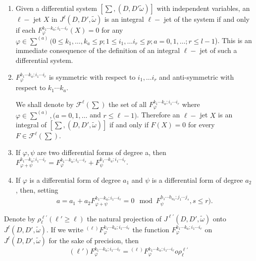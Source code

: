 \begin{remarks*}%
\begin{enumerate}[\rm (1)]
\item Given a differential system $[\sum ,  (D, D' \tilde{\omega})]$
  with independent variables, an $\ell -$ jet $X$ in $J^\ell  (D, D',
  \tilde{\omega})$ is an integral $\ell -$ jet of the system if and
  only if each $F_\varphi^{k_ 1\cdots k_a ; i_1 \cdots i_r} (X) = 0$ for
  any $\varphi \in \sum ^{(a)} (0 \leq k_1, \ldots , k_a \leq p ; 1
  \leq i_1, \ldots i_r \leq p; a = 0,1, \ldots ; r \leq l -1$). This is
  an immediate consequence of the definition	of an integral $\ell
  -$ jet of such a differential system. 
\item $F_\varphi^{k_ 1\cdots k_a ; i_1 \cdots i_r}$ is symmetric with
  respect to $i_1, \ldots i_r$ and anti-symmetric with respect to
  $k_1 \cdots k_a$. 
  
  We shall denote by $\mathscr{F}^\ell (\sum)$ the set of all $F_\varphi^{k_
    1\cdots k_a ; i_1 \cdots i_r}$ where $\varphi \in \sum^{(a)}, (a =
  0, 1, \ldots $ and $r \leq \ell -1)$. Therefore an $\ell -$ jet $X$
  is an integral of $[\sum , (D, D', \tilde{\omega})]$ if and only if
  $F(X) = 0$ for every $F \in \mathscr{F}^\ell (\sum)$. 
\item If $\varphi , \psi$ are two differential forms of degree a, then
  $F^{k_ 1\cdots k_a ; i_1 \cdots i_r }_{\varphi + \psi} = F^{k_
  1\cdots k_a ; i_1 \cdots i_r }_{\varphi } + F^{k_ 1\cdots k_a ; i_1
  \cdots i_r }_{\psi} $. 

\item If $\varphi$ is a differential form of degree $a_1$ and $\psi$
  is a differential form of degree $a_2$, then, setting 
$$
a = a_1 + a_2
  F^{k_ 1\cdots k_a ; i_1 \cdots i_r }_{\varphi + \psi} = 0 \mod F^{h_
    1\cdots h_{a_2} ; j_1 \cdots j_s }_{\psi}, s \leq r).
$$  
\end{enumerate}
\end{remarks*}

Denote by $\rho^{\ell'}_{\ell} (\ell' \geq \ell)$ the natural projection of
$J^{\ell '} (D, D', \tilde{\omega})$ onto $J^\ell (D, D',
\tilde{\omega})$. If we write  ${}^{(\ell)}  F^{k_ 1\cdots k_a ; i_1 \cdots
  i_r }_{\varphi}$ the function $F^{k_ 1\cdots k_a ; i_1 \cdots i_r
}_{\varphi}$ on\break $J^\ell (D, D' , \tilde{\omega})$ for the sake of
precision, then 
$$
(\ell') F^{k_ 1\cdots k_a ; i_1 \cdots i_r }_{\varphi} = {}^{(\ell)} F^{k_
  1\cdots k_a ; i_1 \cdots i_r }_{\varphi} o \rho^{\ell'}_\ell 
$$

